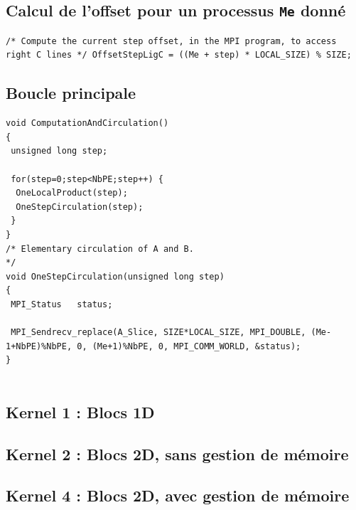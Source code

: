 \documentclass[	DIV=calc,%
							paper=a4,%
							fontsize=11pt%
							]{scrartcl}	 					%
\begin{document}
\subsection*{Calcul de l'offset pour un processus {\texttt{Me} donné}}
\begin{lstlisting}
/* Compute the current step offset, in the MPI program, to access right C lines */ OffsetStepLigC = ((Me + step) * LOCAL_SIZE) % SIZE; 
\end{lstlisting}

\subsection*{Boucle principale}
\begin{lstlisting}
void ComputationAndCirculation()
{
 unsigned long step;
 
 for(step=0;step<NbPE;step++) { 
  OneLocalProduct(step);
  OneStepCirculation(step);
 }
}
/* Elementary circulation of A and B.                                            */
void OneStepCirculation(unsigned long step)
{
 MPI_Status   status;

 MPI_Sendrecv_replace(A_Slice, SIZE*LOCAL_SIZE, MPI_DOUBLE, (Me-1+NbPE)%NbPE, 0, (Me+1)%NbPE, 0, MPI_COMM_WORLD, &status);
}


\end{lstlisting} 

\subsection{Kernel 1 : Blocs 1D}
\subsection{Kernel 2 : Blocs 2D, sans gestion de mémoire}
\subsection{Kernel 4 : Blocs 2D, avec gestion de mémoire}
\end{document}
